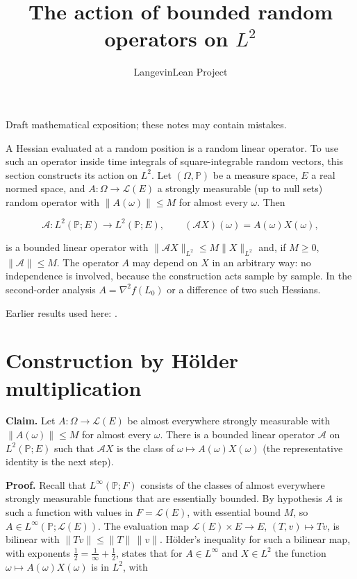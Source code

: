 \documentclass[11pt,a4paper]{article}
\title{\texorpdfstring{The action of bounded random operators on \(L^2\)}{The action of bounded random operators on L²}}
\author{LangevinLean Project}
\date{}
\begin{document}
\maketitle
Draft mathematical exposition; these notes may contain mistakes.


A Hessian evaluated at a random position is a random linear operator. To use such an operator inside time integrals of square-integrable random vectors, this section constructs its action on \(L^2\). Let \((\Omega,\mathbb P)\) be a measure space, \(E\) a real normed space, and \(A:\Omega\to\mathcal L(E)\) a strongly measurable (up to null sets) random operator with \(\|A(\omega)\|\le M\) for almost every \(\omega\). Then


\[\mathcal A:L^2(\mathbb P;E)\to L^2(\mathbb P;E),\qquad(\mathcal AX)(\omega)=A(\omega)X(\omega),\]


is a bounded linear operator with \(\|\mathcal AX\|_{L^2}\le M\|X\|_{L^2}\) and, if \(M\ge0\), \(\|\mathcal A\|\le M\). The operator \(A\) may depend on \(X\) in an arbitrary way: no independence is involved, because the construction acts sample by sample. In the second-order analysis \(A=\nabla^2f(L_0)\) or a difference of two such Hessians.



Earlier results used here: \cite[Section~3.13]{LangevinLean2026ULASC}.

\section{\texorpdfstring{Construction by Hölder multiplication}{Construction by Hölder multiplication}}


\textbf{Claim.} Let \(A:\Omega\to\mathcal L(E)\) be almost everywhere strongly measurable with \(\|A(\omega)\|\le M\) for almost every \(\omega\). There is a bounded linear operator \(\mathcal A\) on \(L^2(\mathbb P;E)\) such that \(\mathcal AX\) is the class of \(\omega\mapsto A(\omega)X(\omega)\) (the representative identity is the next step).




\textbf{Proof.} Recall that \(L^\infty(\mathbb P;F)\) consists of the classes of almost everywhere strongly measurable functions that are essentially bounded. By hypothesis \(A\) is such a function with values in \(F=\mathcal L(E)\), with essential bound \(M\), so \(A\in L^\infty(\mathbb P;\mathcal L(E))\). The evaluation map \(\mathcal L(E)\times E\to E\), \((T,v)\mapsto Tv\), is bilinear with \(\|Tv\|\le\|T\|\,\|v\|\). Hölder's inequality for such a bilinear map, with exponents \(\frac12=\frac1\infty+\frac12\), states that for \(A\in L^\infty\) and \(X\in L^2\) the function \(\omega\mapsto A(\omega)X(\omega)\) is in \(L^2\), with
\end{document}
